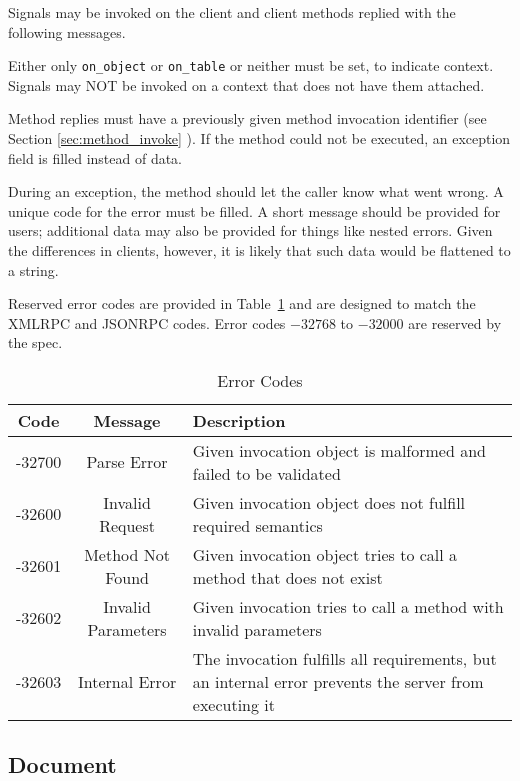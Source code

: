 \documentclass[11pt, oneside]{amsart}
\begin{document}
Signals may be invoked on the client and client methods replied with the following messages.



Either only \texttt{on\_object} or \texttt{on\_table} or neither must be set, to indicate context. Signals may NOT be invoked on a context that does not have them attached.

Method replies must have a previously given method invocation identifier (see Section \ref{sec:method_invoke} ). If the method could not be executed, an exception field is filled instead of data. 

During an exception, the method should let the caller know what went wrong. A unique code for the error must be filled. A short message should be provided for users; additional data may also be provided for things like nested errors. Given the differences in clients, however, it is likely that such data would be flattened to a string.

Reserved error codes are provided in Table~\ref{tab:error_codes} and are designed to match the XMLRPC and JSONRPC codes. Error codes $-32768$ to $-32000$ are reserved by the spec.

\begin{table}
	\begin{tabular}{ccp{3.5in}}
		\toprule
		\textbf{Code} & \textbf{Message} & \textbf{Description} \\
		\midrule
		-32700 & Parse Error & Given invocation object is malformed and failed to be validated \\
		-32600 & Invalid Request & Given invocation object does not fulfill required semantics \\
		-32601 & Method Not Found & Given invocation object tries to call a method that does not exist \\
		-32602 & Invalid Parameters & Given invocation tries to call a method with invalid parameters \\
		-32603 & Internal Error & The invocation fulfills all requirements, but an internal error prevents the server from executing it \\		
		\bottomrule
	\end{tabular}
	\caption{Error Codes}
	\label{tab:error_codes}
\end{table}

\subsection{Document}
\end{document}
